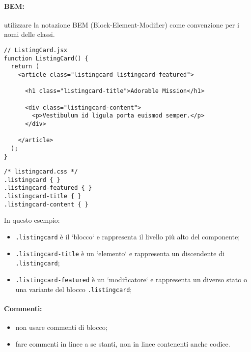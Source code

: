 \documentclass[../ProcessiPrimari.tex]{subfiles}
\begin{document}
\paragraph*{BEM:}
utilizzare la notazione BEM (Block-Element-Modifier) come convenzione per i nomi delle classi.
\begin{center}{
\begin{minipage}{13.5cm}
\begin{Verbatim}[frame=single]
// ListingCard.jsx
function ListingCard() {
  return (
    <article class="listingcard listingcard-featured">

      <h1 class="listingcard-title">Adorable Mission</h1>

      <div class="listingcard-content">
        <p>Vestibulum id ligula porta euismod semper.</p>
      </div>

    </article>
  );
}
\end{Verbatim}
\end{minipage}
}
\end{center}
\begin{center}{
\begin{minipage}{13.5cm}
\begin{Verbatim}[frame=single]
/* listingcard.css */
.listingcard { }
.listingcard-featured { }
.listingcard-title { }
.listingcard-content { }
\end{Verbatim}
\end{minipage}
}
\end{center}
In questo esempio:
\begin{itemize}
	\item \texttt{.listingcard} è il `blocco` e rappresenta il livello più alto del componente;
	\item \texttt{.listingcard-title} è un `elemento` e rappresenta un discendente di \texttt{.listingcard};
	\item \texttt{.listingcard-featured} è un `modificatore` e rappresenta un diverso stato o una variante del blocco \texttt{.listingcard};
\end{itemize}
\paragraph*{Commenti:}
\begin{itemize}
	\item non usare commenti di blocco;
	\item fare commenti in linee a se stanti, non in linee contenenti anche codice.
\end{itemize}
\end{document}

